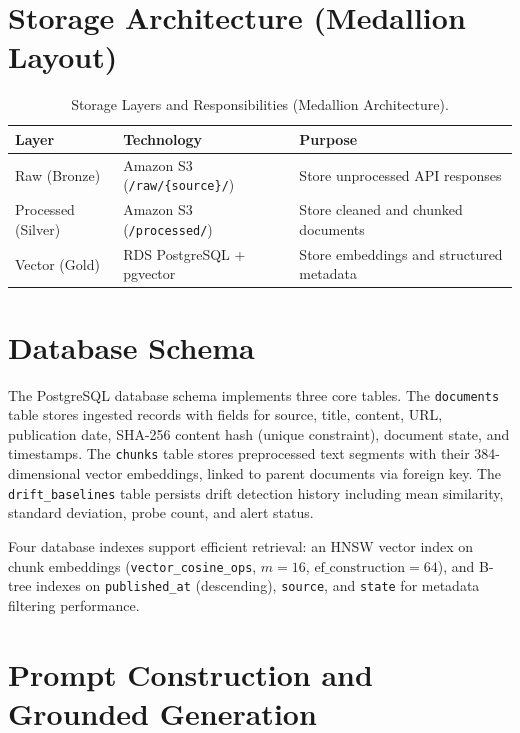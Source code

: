 \documentclass[12pt,a4paper]{report}
\begin{document}
\section{Storage Architecture (Medallion Layout)}
\label{sec:storage}

\begin{table}[H]
\caption{Storage Layers and Responsibilities (Medallion Architecture).}
\label{tab:storage_layers}
\centering
\begin{tabular}{p{2.8cm}p{5.8cm}p{4.0cm}}
\toprule
\textbf{Layer} & \textbf{Technology} & \textbf{Purpose} \\
\midrule
Raw (Bronze) & Amazon S3 (\texttt{/raw/\{source\}/}) & Store unprocessed API responses \\
Processed (Silver) & Amazon S3 (\texttt{/processed/}) & Store cleaned and chunked documents \\
Vector (Gold) & RDS PostgreSQL + pgvector & Store embeddings and structured metadata \\
\bottomrule
\end{tabular}
\end{table}

\section{Database Schema}
\label{sec:schema}

The PostgreSQL database schema implements three core tables. The \texttt{documents} table stores ingested records with fields for source, title, content, URL, publication date, SHA-256 content hash (unique constraint), document state, and timestamps. The \texttt{chunks} table stores preprocessed text segments with their 384-dimensional vector embeddings, linked to parent documents via foreign key. The \texttt{drift\_baselines} table persists drift detection history including mean similarity, standard deviation, probe count, and alert status.

Four database indexes support efficient retrieval: an HNSW vector index on chunk embeddings (\texttt{vector\_cosine\_ops}, $m=16$, $\text{ef\_construction}=64$), and B-tree indexes on \texttt{published\_at} (descending), \texttt{source}, and \texttt{state} for metadata filtering performance.

\section{Prompt Construction and Grounded Generation}
\label{sec:prompt_ch4}
\end{document}
